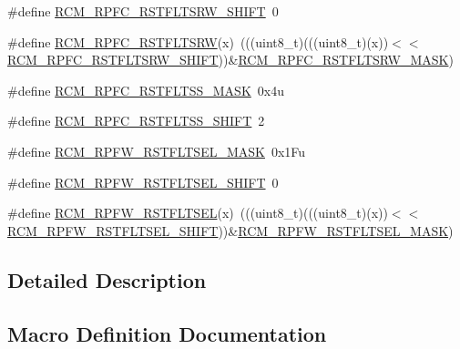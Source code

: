 \begin{DoxyCompactItemize}
\item 
\#define \hyperlink{group___r_c_m___register___masks_gad869b7629ba10023abe459d7293fd281}{R\+C\+M\+\_\+\+R\+P\+F\+C\+\_\+\+R\+S\+T\+F\+L\+T\+S\+R\+W\+\_\+\+S\+H\+I\+FT}~0
\item 
\#define \hyperlink{group___r_c_m___register___masks_ga9e84ee177022331e8509773374670eca}{R\+C\+M\+\_\+\+R\+P\+F\+C\+\_\+\+R\+S\+T\+F\+L\+T\+S\+RW}(x)~(((uint8\+\_\+t)(((uint8\+\_\+t)(x))$<$$<$\hyperlink{group___r_c_m___register___masks_gad869b7629ba10023abe459d7293fd281}{R\+C\+M\+\_\+\+R\+P\+F\+C\+\_\+\+R\+S\+T\+F\+L\+T\+S\+R\+W\+\_\+\+S\+H\+I\+FT}))\&\hyperlink{group___r_c_m___register___masks_ga36e0fc448dc94b90314dd6dd2dd41763}{R\+C\+M\+\_\+\+R\+P\+F\+C\+\_\+\+R\+S\+T\+F\+L\+T\+S\+R\+W\+\_\+\+M\+A\+SK})
\item 
\#define \hyperlink{group___r_c_m___register___masks_gadfb0f8132fbbc978c9756a2adfbf2ed0}{R\+C\+M\+\_\+\+R\+P\+F\+C\+\_\+\+R\+S\+T\+F\+L\+T\+S\+S\+\_\+\+M\+A\+SK}~0x4u
\item 
\#define \hyperlink{group___r_c_m___register___masks_ga4c39eb26fa537bf5e4e6b0ea82ffaeb2}{R\+C\+M\+\_\+\+R\+P\+F\+C\+\_\+\+R\+S\+T\+F\+L\+T\+S\+S\+\_\+\+S\+H\+I\+FT}~2
\item 
\#define \hyperlink{group___r_c_m___register___masks_ga60f29f78d245476ae9716d81b5728739}{R\+C\+M\+\_\+\+R\+P\+F\+W\+\_\+\+R\+S\+T\+F\+L\+T\+S\+E\+L\+\_\+\+M\+A\+SK}~0x1\+Fu
\item 
\#define \hyperlink{group___r_c_m___register___masks_ga489d9757284af48af000b769d36bf21a}{R\+C\+M\+\_\+\+R\+P\+F\+W\+\_\+\+R\+S\+T\+F\+L\+T\+S\+E\+L\+\_\+\+S\+H\+I\+FT}~0
\item 
\#define \hyperlink{group___r_c_m___register___masks_ga2b2127fc8187199672452ef9f62f6a89}{R\+C\+M\+\_\+\+R\+P\+F\+W\+\_\+\+R\+S\+T\+F\+L\+T\+S\+EL}(x)~(((uint8\+\_\+t)(((uint8\+\_\+t)(x))$<$$<$\hyperlink{group___r_c_m___register___masks_ga489d9757284af48af000b769d36bf21a}{R\+C\+M\+\_\+\+R\+P\+F\+W\+\_\+\+R\+S\+T\+F\+L\+T\+S\+E\+L\+\_\+\+S\+H\+I\+FT}))\&\hyperlink{group___r_c_m___register___masks_ga60f29f78d245476ae9716d81b5728739}{R\+C\+M\+\_\+\+R\+P\+F\+W\+\_\+\+R\+S\+T\+F\+L\+T\+S\+E\+L\+\_\+\+M\+A\+SK})
\end{DoxyCompactItemize}


\subsection{Detailed Description}


\subsection{Macro Definition Documentation}
\mbox{\label{group___r_c_m___register___masks_ga9e84ee177022331e8509773374670eca}} 
